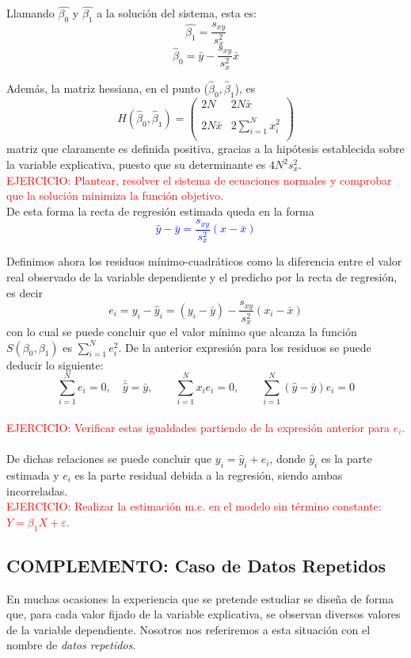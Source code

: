 \documentclass[10pt,a4paper]{book}
\begin{document}
Llamando $\widehat{\beta_0}$ y $\widehat{\beta_1}$ a la solución del sistema, esta es: $$\widehat{\beta_1}=\frac{s_{xy}}{s^2_x}$$ $$\widehat{\beta}_0=\bar{y}-\frac{s_{xy}}{s^2_x}\bar{x}$$

Además, la matriz hessiana, en el punto ($\widehat{\beta}_0,\widehat{\beta}_1$), es $$H(\widehat{\beta}_0,\widehat{\beta}_1)= \left( \begin{array}{cc}
2N & 2N\bar{x}\\
 & \\
2N\bar{x} & 2\displaystyle\sum^N_{i=1}x^2_i\\
 & 
\end{array} \right)$$ matriz que claramente es definida positiva, gracias a la hipótesis establecida sobre la variable explicativa, puesto que su determinante es $4N^2s^2_x$.
\ \\

\textcolor{red}{EJERCICIO: Plantear, resolver el sistema de ecuaciones normales y comprobar que la solución minimiza la función objetivo.}
\ \\

De esta forma la recta de regresión estimada queda en la forma \textcolor{blue}{$$\widehat{y}-\bar{y}=\frac{s_{xy}}{s^2_x}(x-\bar{x})$$}

Definimos ahora los residuos mínimo-cuadráticos como la diferencia entre el valor real observado de la variable dependiente y el predicho por la recta de regresión, es decir $$e_i=y_i-\widehat{y}_i=(y_i-\bar{y})-\frac{s_{xy}}{s^2_x}(x_i-\bar{x})$$ con lo cual se puede concluir que el valor mínimo que alcanza la función $S(\beta_0,\beta_1)$ es $\displaystyle\sum^N_{i=1}e^2_i$.
De la anterior expresión para los residuos se puede deducir lo siguiente: $$\sum^N_{i=1}e_i=0,\quad \bar{\widehat{y}}=\bar{y},\qquad \sum^N_{i=1}x_ie_i=0,\qquad \sum^N_{i=1}(\widehat{y}-\bar{y})e_i=0$$
\ \\

\textcolor{red}{EJERCICIO: Verificar estas igualdades partiendo de la expresión anterior para $e_i$.} 
\ \\

De dichas relaciones se puede concluir que $y_i=\widehat{y}_i + e_i$, donde $\widehat{y}_i$ es la parte estimada y $e_i$ es la parte residual debida a la regresión, siendo ambas incorreladas.
\ \\

\textcolor{red}{EJERCICIO: Realizar la estimación m.c. en el modelo sin término constante: $Y = \beta_1X + \varepsilon$.}
		\subsection*{COMPLEMENTO: Caso de Datos Repetidos}
En muchas ocasiones la experiencia que se pretende estudiar se diseña de forma que, para cada valor fijado de la variable explicativa, se observan diversos valores de la variable dependiente. Nosotros nos referiremos a esta situación con el nombre de \textit{datos repetidos}.
\end{document}
